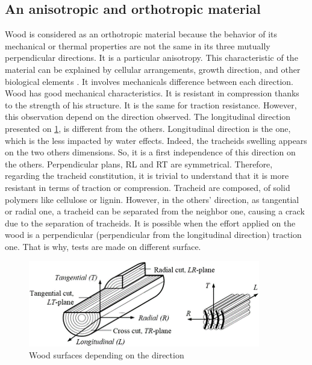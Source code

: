 \subsection{An anisotropic and orthotropic material}

Wood is considered as an orthotropic material because the behavior of its mechanical or thermal properties are not the same in its three mutually perpendicular directions. It is a particular anisotropy. This characteristic of the material can be explained by cellular arrangements, growth direction, and other biological elements \parencite{Reference1}. It involves mechanicals difference between each direction.
Wood has good mechanical characteristics. It is resistant in compression thanks to the strength of his structure. It is the same for traction resistance. However, this observation depend on the direction observed.  
The longitudinal direction presented on \ref{fig:Fig2}, is different from the others. Longitudinal direction is the one, which is the less impacted by water effects. Indeed, the tracheids swelling appears on the two others dimensions. So, it is a first independence of this direction on the others. Perpendicular plans, RL and RT are symmetrical. 
Therefore, regarding the tracheid constitution, it is trivial to understand that it is more resistant in terms of traction or compression. Tracheid are composed, \parencite{Reference4} of solid polymers like cellulose or lignin. However, in the others' direction, as tangential or radial one, a tracheid can be separated from the neighbor one, causing a crack due to the separation of tracheids. It is possible when the effort applied on the wood is a perpendicular (perpendicular from the longitudinal direction) traction one. That is why, tests are made on different surface.
\begin{figure}[th]
	\centering
	\includegraphics{Figures/Wood Surfaces}
	\decoRule
	\caption[Wood surfaces]{Wood surfaces depending on the direction}
	\label{fig:Fig2}
\end{figure}
